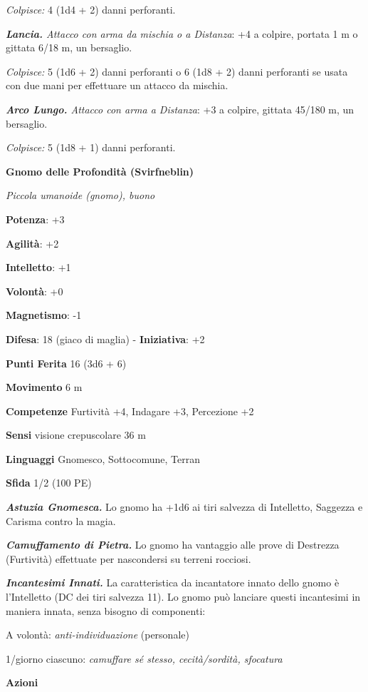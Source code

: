 \begin{multicols}{2}
\emph{Colpisce:} 4 (1d4 + 2) danni perforanti.

\emph{\textbf{Lancia.} Attacco con arma da mischia o a Distanza}: +4 a
colpire, portata 1 m o gittata 6/18 m, un bersaglio.

\emph{Colpisce:} 5 (1d6 + 2) danni perforanti o 6 (1d8 + 2) danni
perforanti se usata con due mani per effettuare un attacco da mischia.

\emph{\textbf{Arco Lungo.} Attacco con arma a Distanza}: +3 a colpire,
gittata 45/180 m, un bersaglio.

\emph{Colpisce:} 5 (1d8 + 1) danni perforanti.

\textbf{Gnomo delle Profondità (Svirfneblin)}

\emph{Piccola umanoide (gnomo), buono}

\textbf{Potenza}: +3

\textbf{Agilità}: +2

\textbf{Intelletto}: +1

\textbf{Volontà}: +0

\textbf{Magnetismo}: -1

\textbf{Difesa}: 18 (giaco di maglia) - \textbf{Iniziativa}: +2

\textbf{Punti Ferita} 16 (3d6 + 6)

\textbf{Movimento} 6 m

\textbf{Competenze} Furtività +4, Indagare +3, Percezione +2

\textbf{Sensi} visione crepuscolare 36 m

\textbf{Linguaggi} Gnomesco, Sottocomune, Terran

\textbf{Sfida} 1/2 (100 PE)\smallskip

\emph{\textbf{Astuzia Gnomesca.}} Lo gnomo ha +1d6 ai tiri salvezza
di Intelletto, Saggezza e Carisma contro la magia.

\emph{\textbf{Camuffamento di Pietra.}} Lo gnomo ha vantaggio alle prove
di Destrezza (Furtività) effettuate per nascondersi su terreni rocciosi.

\emph{\textbf{Incantesimi Innati.}} La caratteristica da incantatore
innato dello gnomo è l'Intelletto (DC dei tiri salvezza 11). Lo gnomo
può lanciare questi incantesimi in maniera innata, senza bisogno di
componenti:

A volontà: \emph{anti-individuazione} (personale)

1/giorno ciascuno: \emph{camuffare sé stesso, cecità/sordità, sfocatura}

\smallskip\textbf{Azioni}


\end{multicols}
